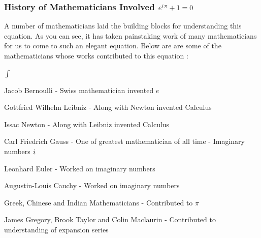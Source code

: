 \documentclass[10pt]{beamer}
\newcommand{\iu}{{i\mkern1mu}}
\begin{document}
\begin{frame}
	\frametitle{ History of Mathematicians Involved \hspace{25pt} \textcolor{pink}{\Huge\(e^{\iu \pi} +1 = 0\)}}

	A number o\label{key}f mathematicians laid the building blocks for understanding this equation.  As you can see, it has taken painstaking work of many mathematicians for us to come to such an elegant equation. Below are are some of the mathematicians whose works contributed to this equation :
	\vspace{10pt}

	\begin{list}{$\int$}{}
		\item Jacob Bernoulli - Swiss mathematician invented $e$
		\item  Gottfried Wilhelm Leibniz  - Along with Newton invented Calculus
		\item Issac Newton - Along with Leibniz invented Calculus
		\item Carl Friedrich Gauss - One of  greatest mathematician of all time - Imaginary numbers $\iu$
		\item Leonhard Euler - Worked on imaginary numbers
		\item Augustin-Louis Cauchy - Worked on imaginary numbers
		\item Greek, Chinese and Indian Mathematicians - Contributed to $\pi$
		\item James Gregory, Brook Taylor and Colin Maclaurin - Contributed to understanding of expansion series
	\end{list}

\end{frame}
\end{document}

